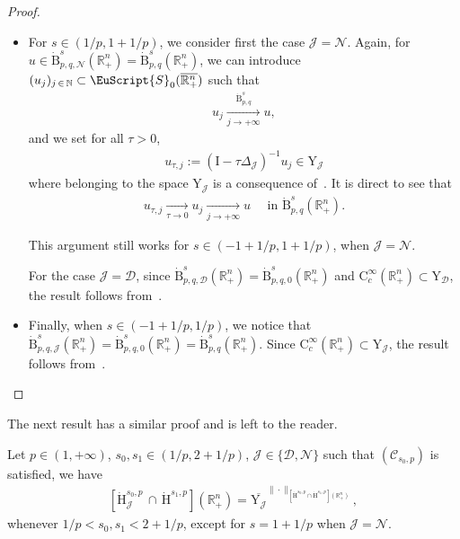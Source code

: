\documentclass[AHL,Unicode,longabstracts,published]{cedram}
\newcommand{\bbR}{\mathbb{R}}
\newcommand{\bbN}{\mathbb{N}}
\newcommand{\rmH}{\mathrm{H}}%
\newcommand{\rmB}{\mathrm{B}}
\newcommand{\rmC}{\mathrm{C}}
\newcommand{\rmI}{\mathrm{I}}
\newcommand{\rmY}{\mathrm{Y}}
\newcommand{\clC}{\mathcal{C}}
\newcommand{\clN}{\mathcal{N}}
\newcommand{\clJ}{\mathcal{J}}
\newcommand{\clD}{\mathcal{D}}
\newcommand{\eus}{\EuScript}
\begin{document}
\begin{proof}
\begin{itemize}
\begin{align*}
\left\| u - u_{j,\lambda} \right\|_{\dot{\rmB}^{s}_{p,q}\left(\bbR^n_+\right)}\leqslant \left\| u - u_j \right\|_{\dot{\rmB}^{s}_{p,q}\left(\bbR^n_+\right)} + \left\| u_j - u_{j,\lambda} \right\|_{\dot{\rmB}^{s}_{p,q}\left(\bbR^n_+\right)}<2\varepsilon.
\end{align*}
This concludes the case $s\in(1+1/p,2+1/p)$.

\item For $s\in (1/p,1+1/p)$, we consider first the case $\clJ=\clN$. Again, for $u\in\dot{\rmB}^{s}_{p,q,\clN}(\bbR^n_+)=\dot{\rmB}^{s}_{p,q}(\bbR^n_+)$, we can introduce $(u_j)_{j\,\in\,\bbN } \subset \eus{S}_0(\overline{\bbR^n_+})$ such that
\begin{align*}
u_j \xrightarrow[j\rightarrow +\infty]{\dot{\rmB}^{s}_{p,q}} u,
\end{align*}
and we set for all $\tau>0$,
\begin{align*}
u_{\tau,j}:= (\rmI -\tau\Delta_{\clJ})^{-1}u_j \in \rmY_{\clJ}
\end{align*}
where belonging to the space $\rmY_{\clJ}$ is a consequence of~\cite[Propositions~5.4~\&~5.6]{Gaudin2022}. It is direct to see that
\begin{align*}
u_{\tau,j}\xrightarrow[\tau\rightarrow 0]{} u_{j}\xrightarrow[j\rightarrow +\infty]{} u \quad \text{ in } \dot{\rmB}^{s}_{p,q}(\bbR^n_+).
\end{align*}

This argument still works for $s\in(-1+1/p,1+1/p)$, when $\clJ=\clN$.

For the case $\clJ=\clD$, since $\dot{\rmB}^{s}_{p,q,\clD}(\bbR^n_+)=\dot{\rmB}^{s}_{p,q,0}(\bbR^n_+)$ and $\rmC _c^\infty(\bbR^n_+) \subset \rmY_{\mathcal{\clD}}$, the result follows from~\cite[Lemma~3.16]{Gaudin2022}.

\item Finally, when $s\in (-1+1/p,1/p)$, we notice that $\dot{\rmB}^{s}_{p,q,\clJ}(\bbR^n_+)=\dot{\rmB}^{s}_{p,q,0}(\bbR^n_+)=\dot{\rmB}^{s}_{p,q}(\bbR^n_+)$. Since $\rmC _c^\infty(\bbR^n_+) \subset \rmY_{\mathcal{\clJ}}$, the result follows from~\cite[Corollary~3.18]{Gaudin2022}.\qedhere
\end{itemize}
\end{proof}


The next result has a similar proof and is left to the reader.

\begin{prop}\label{prop:DensityResultHomNeum\^IntersecSobol}
Let $p\in(1,+\infty)$, $s_0,s_1\in(1/p,2+1/p)$, $\clJ\in\{\clD,\clN\}$ such that $(\clC_{s_0,p})$ is satisfied, we have
\begin{align*}
\left[\dot{\rmH}^{s_0,p}_{\clJ}\,\cap\,{\dot{\rmH}^{s_1,p}}\right]\left(\bbR^n_+\right) = \overline{\rmY_{\clJ}}^{\|\cdot\|_{\left[\dot{\rmH}^{s_0,p}\cap{\dot{\rmH}^{s_1,p}}\right]\left(\bbR^n_+\right)}},
\end{align*}
whenever $1/p<s_0,s_1<2+1/p$, except for $s=1+1/p$ when $\clJ=\clN$.
\end{prop}
\end{document}
